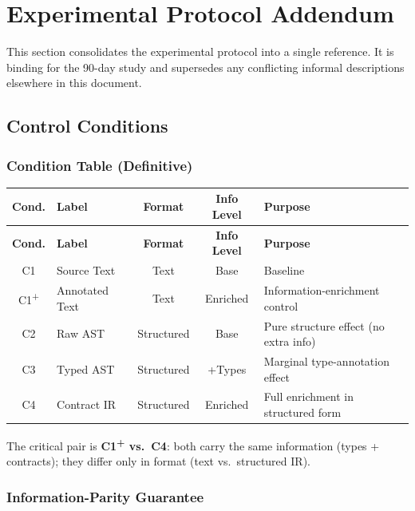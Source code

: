 \documentclass[11pt]{article}
\begin{document}
\section{Experimental Protocol Addendum}
\label{sec:protocol}

This section consolidates the experimental protocol into a single
reference.  It is binding for the 90-day study and supersedes any
conflicting informal descriptions elsewhere in this document.


\subsection{Control Conditions}

\subsubsection*{Condition Table (Definitive)}

\begin{longtable}{@{}clccp{4.5cm}@{}}
  \toprule
  \textbf{Cond.} & \textbf{Label} & \textbf{Format} &
    \textbf{Info Level} & \textbf{Purpose} \\
  \midrule
  \endfirsthead
  \toprule
  \textbf{Cond.} & \textbf{Label} & \textbf{Format} &
    \textbf{Info Level} & \textbf{Purpose} \\
  \midrule
  \endhead
  C1 & Source Text & Text & Base & Baseline \\
  C1\textsuperscript{+} & Annotated Text & Text & Enriched &
    Information-enrichment control \\
  C2 & Raw AST & Structured & Base &
    Pure structure effect (no extra info) \\
  C3 & Typed AST & Structured & +Types &
    Marginal type-annotation effect \\
  C4 & Contract IR & Structured & Enriched &
    Full enrichment in structured form \\
  \bottomrule
\end{longtable}

The critical pair is \textbf{C1\textsuperscript{+} vs.\ C4}: both
carry the same information (types + contracts); they differ only in
format (text vs.\ structured IR).

\subsubsection*{Information-Parity Guarantee}
\end{document}
